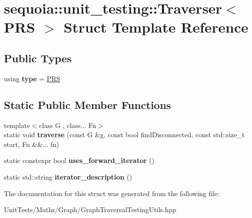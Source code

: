 \hypertarget{structsequoia_1_1unit__testing_1_1_traverser_3_01_p_r_s_01_4}{}\section{sequoia\+::unit\+\_\+testing\+::Traverser$<$ P\+RS $>$ Struct Template Reference}
\label{structsequoia_1_1unit__testing_1_1_traverser_3_01_p_r_s_01_4}
\subsection*{Public Types}
\begin{DoxyCompactItemize}
\item 
\mbox{\label{structsequoia_1_1unit__testing_1_1_traverser_3_01_p_r_s_01_4_a89d5e6b1c683f09d7dc2f85ca999e67b}} 
using {\bfseries type} = \mbox{\hyperlink{structsequoia_1_1unit__testing_1_1_p_r_s}{P\+RS}}
\end{DoxyCompactItemize}
\subsection*{Static Public Member Functions}
\begin{DoxyCompactItemize}
\item 
\mbox{\label{structsequoia_1_1unit__testing_1_1_traverser_3_01_p_r_s_01_4_ab190f8a3e2ec7d82454d9e59d90db76a}} 
{\footnotesize template$<$class G , class... Fn$>$ }\\static void {\bfseries traverse} (const G \&g, const bool find\+Disconnected, const std\+::size\+\_\+t start, Fn \&\&... fn)
\item 
\mbox{\label{structsequoia_1_1unit__testing_1_1_traverser_3_01_p_r_s_01_4_a2bece362b80eb98b3f59c3463a54b678}} 
static constexpr bool {\bfseries uses\+\_\+forward\+\_\+iterator} ()
\item 
\mbox{\label{structsequoia_1_1unit__testing_1_1_traverser_3_01_p_r_s_01_4_a7931f5dbc22913e399e748e841ef4f2c}} 
static std\+::string {\bfseries iterator\+\_\+description} ()
\end{DoxyCompactItemize}


The documentation for this struct was generated from the following file\+:\begin{DoxyCompactItemize}
\item 
Unit\+Tests/\+Maths/\+Graph/Graph\+Traversal\+Testing\+Utils.\+hpp\end{DoxyCompactItemize}
